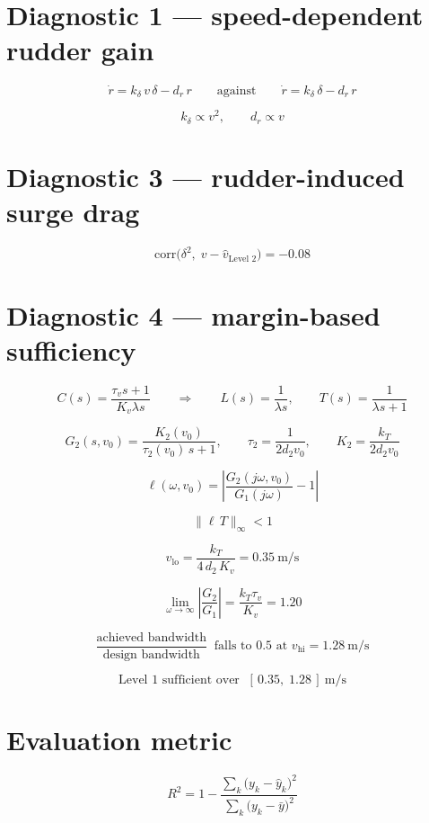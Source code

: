 \documentclass[11pt]{article}
\begin{document}
\section*{Diagnostic 1 — speed-dependent rudder gain}

\[
\dot r = k_\delta\,v\,\delta - d_r\,r
\qquad\text{against}\qquad
\dot r = k_\delta\,\delta - d_r\,r
\]

\[
k_\delta \propto v^2,
\qquad
d_r \propto v
\]

\section*{Diagnostic 3 — rudder-induced surge drag}

\[
\mathrm{corr}\bigl(\delta^2,\; v - \hat v_{\text{Level 2}}\bigr) = -0.08
\]

\section*{Diagnostic 4 — margin-based sufficiency}

\[
C(s) = \frac{\tau_v s + 1}{K_v \lambda s}
\qquad\Longrightarrow\qquad
L(s) = \frac{1}{\lambda s},
\qquad
T(s) = \frac{1}{\lambda s + 1}
\]

\[
G_2(s,v_0) = \frac{K_2(v_0)}{\tau_2(v_0)\,s + 1},
\qquad
\tau_2 = \frac{1}{2 d_2 v_0},
\qquad
K_2 = \frac{k_T}{2 d_2 v_0}
\]

\[
\ell(\omega, v_0) = \left| \frac{G_2(j\omega, v_0)}{G_1(j\omega)} - 1 \right|
\]

\[
\|\ell\,T\|_\infty < 1
\]

\[
v_{\mathrm{lo}} = \frac{k_T}{4\,d_2\,K_v} = 0.35~\mathrm{m/s}
\]

\[
\lim_{\omega\to\infty} \left|\frac{G_2}{G_1}\right| = \frac{k_T \tau_v}{K_v} = 1.20
\]

\[
\frac{\text{achieved bandwidth}}{\text{design bandwidth}}
\;\;\text{falls to } 0.5 \text{ at } v_{\mathrm{hi}} = 1.28~\mathrm{m/s}
\]

\[
\text{Level 1 sufficient over } \; [\,0.35,\; 1.28\,]~\mathrm{m/s}
\]

\section*{Evaluation metric}

\[
R^2 = 1 - \frac{\sum_k \bigl(y_k - \hat y_k\bigr)^2}
                {\sum_k \bigl(y_k - \bar y\bigr)^2}
\]
\end{document}
